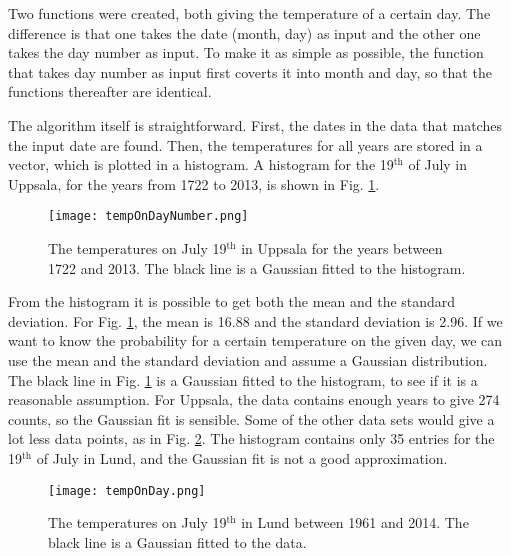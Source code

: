 

Two functions were created, both giving the temperature of a certain day. The difference is that one takes the date (month, day) as input and the other one takes the day number as input. To make it as simple as possible, the function that takes day number as input first coverts it into month and day, so that the functions thereafter are identical. 

The algorithm itself is straightforward. First, the dates in the data that matches the input date are found. Then, the temperatures for all years are stored in a vector, which is plotted in a histogram. A histogram for the 19$^{\text{th}}$ of July in Uppsala, for the years from 1722 to 2013, is shown in Fig. \ref{fig:tempOnDayNumber}.

\begin{figure}[ht]
\begin{center}
\texttt{[image: tempOnDayNumber.png]}
\caption{\label{fig:tempOnDayNumber} The temperatures on July 19$^{\text{th}}$ in Uppsala for the years between 1722 and 2013. The black line is a Gaussian fitted to the histogram.}
\end{center}
\end{figure}

From the histogram it is possible to get both the mean and the standard deviation. For Fig. \ref{fig:tempOnDayNumber}, the mean is 16.88 and the standard deviation is 2.96. If we want to know the probability for a certain temperature on the given day, we can use the mean and the standard deviation and assume a Gaussian distribution. The black line in Fig. \ref{fig:tempOnDayNumber} is a Gaussian fitted to the histogram, to see if it is a reasonable assumption. For Uppsala, the data contains enough years to give 274 counts, so the Gaussian fit is sensible. Some of the other data sets would give a lot less data points, as in Fig. \ref{fig:tempOnDay}. The histogram contains only 35 entries for the 19$^{\text{th}}$ of July in Lund, and the Gaussian fit is not a good approximation. 

\begin{figure}[ht]
\begin{center}
\texttt{[image: tempOnDay.png]}
\caption{\label{fig:tempOnDay} The temperatures on July 19$^{\text{th}}$ in Lund between 1961 and 2014. The black line is a Gaussian fitted to the data.}
\end{center}
\end{figure}

\begin{comment}
\begin{figure}[ht]
\centering
\subfloat[Uppsala]{\label{fig:tempOnDayNumber2}\texttt{[image: tempOnDayNumber.png]}} 
\subfloat[Lund]{\label{fig:tempOnDay2}\texttt{[image: tempOnDay.png]}}\\
\caption{The temperatures on July 19$^{th}$ in Uppsala for the years between 1722 and 2013 in (a). The black line is a Gaussian fitted to the histogram.}
\label{fig:spring}
\end{figure}
\end{comment}


